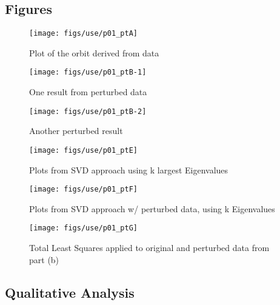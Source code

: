 \documentclass[paper=a4, fontsize=11pt]{scrartcl}
\numberwithin{equation}{section}		%
\numberwithin{figure}{section}			%
\numberwithin{table}{section}				%
\begin{document}
\vspace{4mm}
\subsection{Figures}

\begin{figure}[!hbt]
		\texttt{[image: figs/use/p01\_ptA]}
		\caption{Plot of the orbit derived from data}
		\label{fig:3.5-a}
	\endminipage\hfill
		\texttt{[image: figs/use/p01\_ptB-1]}
		\caption{One result from perturbed data}
		\label{fig:3.5-b1}
	\endminipage\hfill
		\texttt{[image: figs/use/p01\_ptB-2]}
		\caption{Another perturbed result}
		\label{fig:3.5-b2}
	\endminipage\hfill
\end{figure}
\begin{figure}[!hbt]
		\texttt{[image: figs/use/p01\_ptE]}
		\caption{Plots from SVD approach using k largest Eigenvalues}
		\label{fig:3.5-e}
	\endminipage\hfill
		\texttt{[image: figs/use/p01\_ptF]}
		\caption{Plots from SVD approach w/ perturbed data, using k Eigenvalues}
		\label{fig:3.5-f}
	\endminipage\hfill
\end{figure}
\begin{figure}[!hbt]
	\texttt{[image: figs/use/p01\_ptG]}
	\caption{Total Least Squares applied to original and perturbed data from part (b)}
	\label{fig:3.5-g}
	\endminipage\hfill
\end{figure}

\vspace{4mm}
\subsection{Qualitative Analysis}
\end{document}
